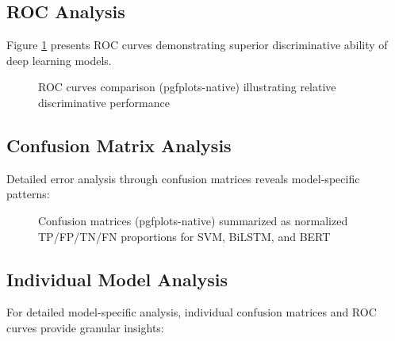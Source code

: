 \documentclass[conference]{IEEEtran}
\begin{document}
\subsection{ROC Analysis}

Figure \ref{fig:roc} presents ROC curves demonstrating superior discriminative ability of deep learning models.

\begin{figure}[H]
    \centering
    \ROCPlot
    \caption{ROC curves comparison (pgfplots-native) illustrating relative discriminative performance}
    \label{fig:roc}
\end{figure}

\subsection{Confusion Matrix Analysis}

Detailed error analysis through confusion matrices reveals model-specific patterns:

\begin{figure}[H]
    \centering
    \ConfusionMatricesPlot
    \caption{Confusion matrices (pgfplots-native) summarized as normalized TP/FP/TN/FN proportions for SVM, BiLSTM, and BERT}
    \label{fig:confusion}
\end{figure}

\subsection{Individual Model Analysis}

For detailed model-specific analysis, individual confusion matrices and ROC curves provide granular insights:
\end{document}

